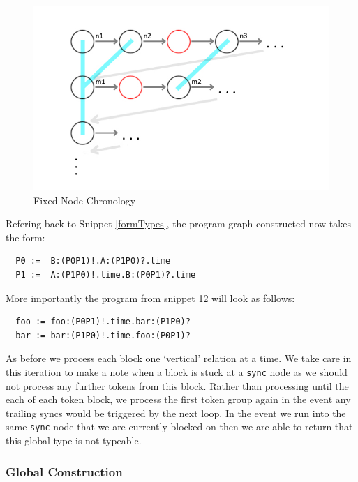 \documentclass[11pt, abstracton, twoside]{scrartcl}
\begin{document}
\begin{figure}[h!]
	\centering
	\includegraphics[width=\textwidth]{images/GraphTwo.jpg}
	\caption{Fixed Node Chronology}
\end{figure}

Refering back to Snippet \ref{formTypes}, the program graph constructed now takes
the form:
\\
\begin{lstlisting}
  P0 :=  B:(P0P1)!.A:(P1P0)?.time
  P1 :=  A:(P1P0)!.time.B:(P0P1)?.time
\end{lstlisting}

More importantly the program from snippet 12 will look as follows:
\\
\begin{lstlisting}
  foo := foo:(P0P1)!.time.bar:(P1P0)?
  bar := bar:(P1P0)!.time.foo:(P0P1)?
\end{lstlisting}

As before we process each block one `vertical' relation at a time. We take
care in this iteration to make a note when a block is stuck at a \texttt{sync}
node as we should not process any further tokens from this block. Rather than
processing until the each of each token block, we process the first token group
again in the event any trailing syncs would be triggered by the next loop. In
the event we run into the same \texttt{sync} node that we are currently blocked
on then we are able to return that this global type is not typeable.


\subsubsection{Global Construction}
\end{document}
